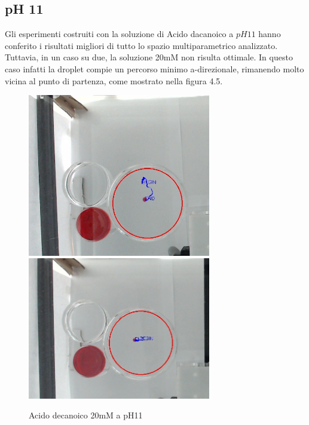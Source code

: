 \subsection{pH 11}
Gli esperimenti costruiti con la soluzione di Acido dacanoico a $pH11$ hanno conferito i risultati migliori di tutto lo spazio multiparametrico analizzato. Tuttavia, in un caso su due, la soluzione 20mM non risulta ottimale. In questo caso infatti la droplet compie un percorso minimo a-direzionale, rimanendo molto vicina al punto di partenza, come mostrato nella figura 4.5. 
\begin{figure}[h]
	\centering
   		{\includegraphics[width=8cm]{immagini/20mMpH11-2.jpg}}
 	\hspace{2mm}   	
		{\includegraphics[width=8cm]{immagini/20mMpH11-1.jpg}}
	\caption{Acido decanoico 20mM a pH11}
\end{figure}
